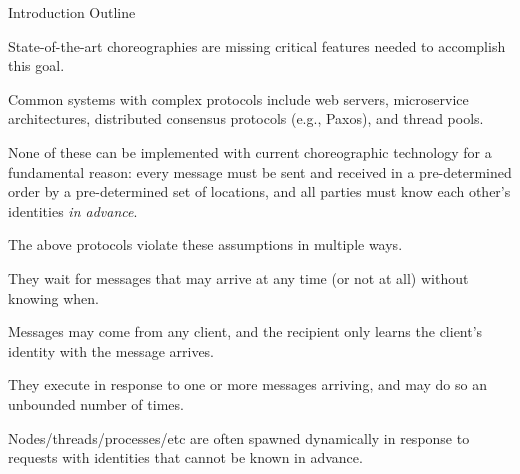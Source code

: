 \begin{outline}{Introduction Outline}
    \item State-of-the-art choreographies are missing critical features needed to accomplish this goal.
    \begin{lvl}
      \item Common systems with complex protocols include
        web servers, microservice architectures, distributed consensus protocols (e.g., Paxos), and thread pools.
      \item None of these can be implemented with current choreographic technology for a fundamental reason:
        every message must be sent and received in a pre-determined order by a pre-determined set of locations,
        and all parties must know each other's identities \emph{in advance}.
      \item The above protocols violate these assumptions in multiple ways.
        \begin{lvl}
          \item They wait for messages that may arrive at any time (or not at all) without knowing when.
          \item Messages may come from any client, and the recipient only learns the client's identity with the message arrives.
          \item They execute in response to one or more messages arriving, and may do so an unbounded number of times.
          \item Nodes/threads/processes/etc are often spawned dynamically in response to requests
            with identities that cannot be known in advance.
        \end{lvl}
    \end{lvl}


\end{outline}
